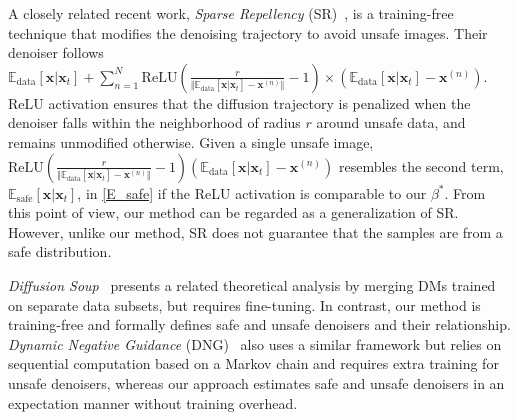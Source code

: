 A closely related recent work, \textit{Sparse Repellency} (SR)~\cite{kirchhof2024sparse}, is a training-free technique that modifies the denoising trajectory to avoid unsafe images. Their denoiser follows $\mathbb{E}_{\text{data}}[\mathbf{x}\vert\mathbf{x}_{t}]+\sum_{n=1}^{N}\text{ReLU}\left(\tfrac{r}{\Vert\mathbb{E}_{\text{data}}[\mathbf{x}\vert\mathbf{x}_{t}]-\mathbf{x}^{(n)}\Vert}-1\right) \times(\mathbb{E}_{\text{data}}[\mathbf{x}\vert\mathbf{x}_{t}]-\mathbf{x}^{(n)}).$
%
%
%
ReLU activation ensures that the diffusion trajectory is penalized when the denoiser falls within the neighborhood of radius $r$ around unsafe data, and remains unmodified otherwise. 
Given a single unsafe image, $\text{ReLU}\left(\tfrac{r}{\Vert\mathbb{E}_{\text{data}}[\mathbf{x}\vert\mathbf{x}_{t}]-\mathbf{x}^{(n)}\Vert}-1\right) (\mathbb{E}_{\text{data}}[\mathbf{x}\vert \mathbf{x}_{t}]-\mathbf{x}^{(n)})$ resembles the second term, $\mathbb{E}_{\text{safe}}[\mathbf{x}\vert\mathbf{x}_{t}]$, in \eqref{E_safe} if the ReLU activation is comparable to our $\beta^*$. From this point of view, our method can be regarded as a generalization of SR.
However, unlike our method, SR does not guarantee that the samples are from a safe distribution. 

\textit{Diffusion Soup}~\cite{biggs2024diffusion} presents a related theoretical analysis by merging DMs trained on separate data subsets, but requires fine-tuning. In contrast, our method is training-free and formally defines safe and unsafe denoisers and their relationship. \textit{Dynamic Negative Guidance} (DNG)~\cite{koulischer2025dynamic} also uses a similar framework but relies on sequential computation based on a Markov chain and requires extra training for unsafe denoisers, whereas our approach estimates safe and unsafe denoisers in an expectation manner without training overhead.